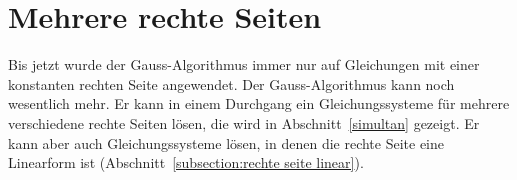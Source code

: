 %
%
%
\section{Mehrere rechte Seiten\label{section:mehrere rechte seiten}}
Bis jetzt wurde der Gauss-Algorithmus immer nur auf Gleichungen mit
einer konstanten rechten Seite angewendet.
Der Gauss-Algorithmus kann noch wesentlich mehr.
Er kann in einem Durchgang ein Gleichungssysteme für mehrere verschiedene
rechte Seiten lösen, die wird in Abschnitt~\ref{simultan} gezeigt.
Er kann aber auch Gleichungssysteme lösen, in denen die rechte
Seite eine Linearform ist (Abschnitt~\ref{subsection:rechte seite linear}).

%
%

